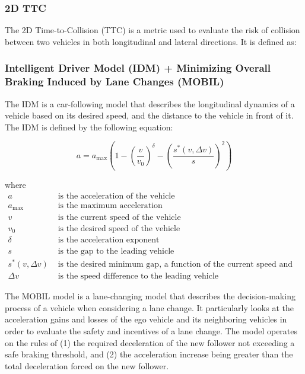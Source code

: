 \documentclass[12pt, a4paper]{report}
\begin{document}
\subsubsection{2D TTC}

The 2D Time-to-Collision (TTC) is a metric used to evaluate the risk of collision between two vehicles in both longitudinal and lateral directions. It is defined as:


\subsubsection{Intelligent Driver Model (IDM) + Minimizing Overall Braking Induced by Lane Changes (MOBIL)}

The IDM is a car-following model that describes the longitudinal dynamics of a vehicle based on its desired speed, and the 
distance to the vehicle in front of it. The IDM is defined by the following equation:

\begin{equation}
    a = a_{\text{max}}\left(1 - \left(\frac{v}{v_0}\right)^{\delta} - \left(\frac{s^*(v, \Delta v)}{s}\right)^2\right)
\end{equation}

where
\begin{align}
    a & \text{ is the acceleration of the vehicle} \\
    a_{\text{max}} & \text{ is the maximum acceleration} \\
    v & \text{ is the current speed of the vehicle} \\
    v_0 & \text{ is the desired speed of the vehicle} \\
    \delta & \text{ is the acceleration exponent} \\
    s & \text{ is the gap to the leading vehicle} \\
    s^*(v, \Delta v) & \text{ is the desired minimum gap, a function of the current speed and speed difference} \\
    \Delta v & \text{ is the speed difference to the leading vehicle}
\end{align}

The MOBIL model is a lane-changing model that describes the decision-making process of a vehicle when considering a lane change.
It particularly looks at the acceleration gains and losses of the ego vehicle and its neighboring vehicles in order to evaluate
the safety and incentives of a lane change. The model operates on the rules of (1) the required deceleration of the new follower
not exceeding a safe braking threshold, and (2) the acceleration increase being greater than the total deceleration forced on the new follower.
\end{document}
